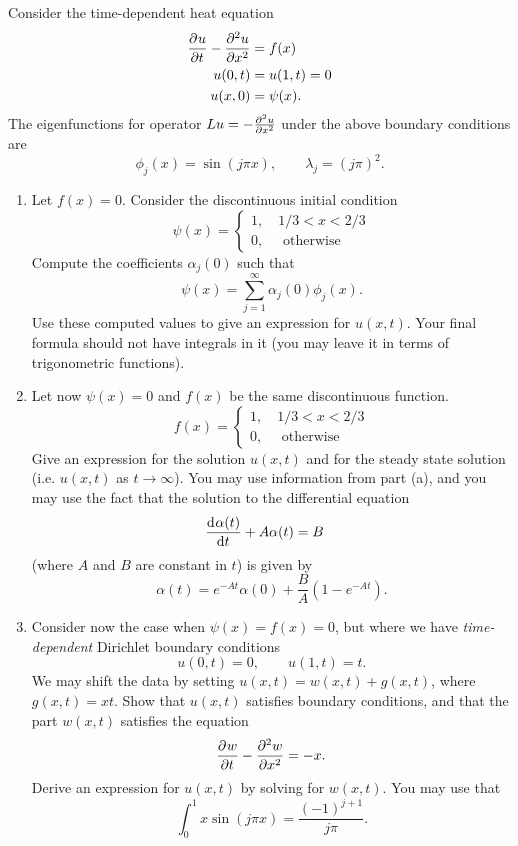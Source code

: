 Consider the time-dependent heat equation
\begin{align*}
\pd{u}{t}{} - \pd{u}{x}{2} &= f(x)\\
u(0,t) &= u(1,t) = 0\\%
u(x,0) &= \psi(x).
\end{align*}
The eigenfunctions for operator $Lu = -\frac{\partial^{2} u}{\partial x^{2}}$ under the above boundary conditions are 
\[
\phi_j(x) = \sin\left(j\pi x\right), \qquad \lambda_j = (j\pi)^2.
\]
\begin{enumerate}
\item Let $f(x) = 0$.  Consider the discontinuous initial condition
\[
\psi(x) = \begin{cases}
1, \quad 1/3 < x < 2/3\\
0, \quad \text{ otherwise}
\end{cases}
\]
Compute the coefficients $\alpha_j(0)$ such that 
\[
\psi(x) = \sum_{j=1}^\infty \alpha_j(0)\phi_j(x).
\]
Use these computed values to give an expression for $u(x,t)$.  Your final formula should not have integrals in it (you may leave it in terms of trigonometric functions).
\item Let now $\psi(x) = 0$ and $f(x)$ be the same discontinuous function.  
\[
f(x) = \begin{cases}
1, \quad 1/3 < x < 2/3\\
0, \quad \text{ otherwise}
\end{cases}
\]
Give an expression for the solution $u(x,t)$ and for the steady state solution (i.e. $u(x,t)$ as $t\rightarrow \infty$).  You may use information from part (a), and you may use the fact that the solution to the differential equation
\begin{align*}
\frac{{\rm d}^{} \alpha(t)}{{\rm d} t^{}} + A\alpha(t) &= B
\end{align*}
(where $A$ and $B$ are constant in $t$) is given by  
\[
\alpha(t) = e^{-At}\alpha(0) + \frac{B}{A}\left(1-e^{-At}\right).
\]
\item Consider now the case when $\psi(x) = f(x) = 0$, but where we have \emph{time-dependent} Dirichlet boundary conditions 
\[
u(0,t) = 0, \qquad u(1,t) = t.
\]
We may shift the data by setting $u(x,t) = w(x,t) + g(x,t)$, where $g(x,t)= xt$.  Show that $u(x,t)$ satisfies boundary conditions, and that the part $w(x,t)$ satisfies the equation
\[
\frac{\partial^{} w}{\partial t^{}} - \frac{\partial^{2} w}{\partial x^{2}} = -x.
\]
Derive an expression for $u(x,t)$ by solving for $w(x,t)$.  You may use that
\[
\int_0^1 x\sin(j\pi x) = \frac{(-1)^{j+1}}{j\pi}.
\]
\end{enumerate}